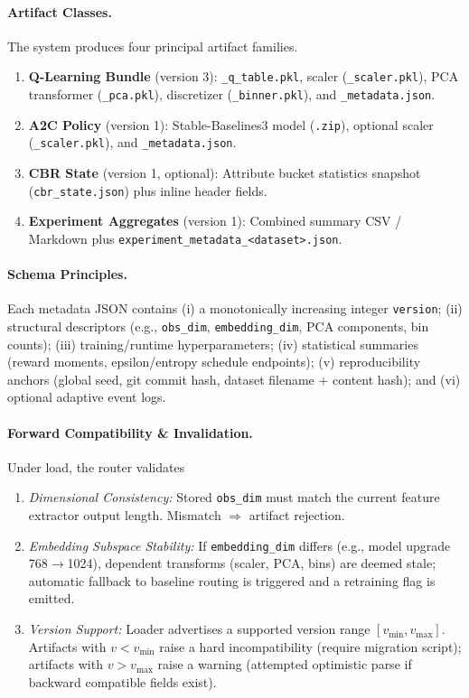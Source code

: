\paragraph{Artifact Classes.} The system produces four principal artifact families.
\begin{enumerate}
  \item \textbf{Q-Learning Bundle} (version 3): \texttt{\_q\_table.pkl}, scaler (\texttt{\_scaler.pkl}), PCA transformer (\texttt{\_pca.pkl}), discretizer (\texttt{\_binner.pkl}), and \texttt{\_metadata.json}.
  \item \textbf{A2C Policy} (version 1): Stable-Baselines3 model (\texttt{.zip}), optional scaler (\texttt{\_scaler.pkl}), and \texttt{\_metadata.json}.
  \item \textbf{CBR State} (version 1, optional): Attribute bucket statistics snapshot (\texttt{cbr\_state.json}) plus inline header fields.
  \item \textbf{Experiment Aggregates} (version 1): Combined summary CSV / Markdown plus \texttt{experiment\_metadata\_<dataset>.json}.
\end{enumerate}

\paragraph{Schema Principles.} Each metadata JSON contains (i) a monotonically increasing integer \texttt{version}; (ii) structural descriptors (e.g., \texttt{obs\_dim}, \texttt{embedding\_dim}, PCA components, bin counts); (iii) training/runtime hyperparameters; (iv) statistical summaries (reward moments, epsilon/entropy schedule endpoints); (v) reproducibility anchors (global seed, git commit hash, dataset filename + content hash); and (vi) optional adaptive event logs.

\paragraph{Forward Compatibility \& Invalidation.} Under load, the router validates
\begin{enumerate}
  \item \emph{Dimensional Consistency:} Stored \texttt{obs\_dim} must match the current feature extractor output length. Mismatch $\Rightarrow$ artifact rejection.
  \item \emph{Embedding Subspace Stability:} If \texttt{embedding\_dim} differs (e.g., model upgrade 768$\rightarrow$1024), dependent transforms (scaler, PCA, bins) are deemed stale; automatic fallback to baseline routing is triggered and a retraining flag is emitted.
  \item \emph{Version Support:} Loader advertises a supported version range $[v_{\min}, v_{\max}]$. Artifacts with $v < v_{\min}$ raise a hard incompatibility (require migration script); artifacts with $v > v_{\max}$ raise a warning (attempted optimistic parse if backward compatible fields exist).
\end{enumerate}

